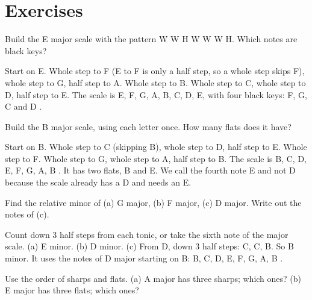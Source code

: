 \section*{Exercises}

\begin{exercise}
Build the E major scale with the pattern W W H W W W H. Which notes are black keys?
\end{exercise}

\begin{answerbox}
Start on E. Whole step to F\sh{} (E to F is only a half step, so a whole step skips F), whole step to G\sh, half step to A. Whole step to B. Whole step to C\sh, whole step to D\sh, half step to E. The scale is E, F\sh, G\sh, A, B, C\sh, D\sh, E, with four black keys: F\sh, G\sh, C\sh{} and D\sh{} .
\end{answerbox}

\begin{exercise}
Build the B\fl{} major scale, using each letter once. How many flats does it have?
\end{exercise}

\begin{answerbox}
Start on B\fl. Whole step to C (skipping B), whole step to D, half step to E\fl. Whole step to F. Whole step to G, whole step to A, half step to B\fl. The scale is B\fl, C, D, E\fl, F, G, A, B\fl{} . It has two flats, B\fl{} and E\fl. We call the fourth note E\fl{} and not D\sh{} because the scale already has a D and needs an E.
\end{answerbox}

\begin{exercise}
Find the relative minor of (a) G major, (b) F major, (c) D major. Write out the notes of (c).
\end{exercise}

\begin{answerbox}
Count down 3 half steps from each tonic, or take the sixth note of the major scale. (a) E minor. (b) D minor. (c) From D, down 3 half steps: C\sh, C, B. So B minor. It uses the notes of D major starting on B: B, C\sh, D, E, F\sh, G, A, B .
\end{answerbox}

\begin{exercise}
Use the order of sharps and flats. (a) A major has three sharps; which ones? (b) E\fl{} major has three flats; which ones?
\end{exercise}

